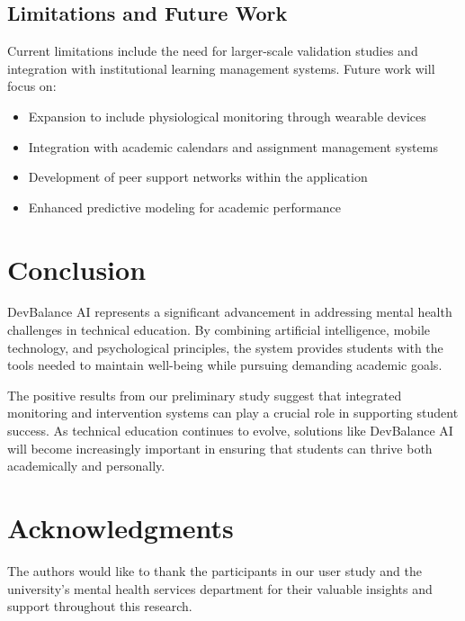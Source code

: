 \documentclass[conference,10pt]{IEEEtran}
\begin{document}
\subsection{Limitations and Future Work}

Current limitations include the need for larger-scale validation studies and integration with institutional learning management systems. Future work will focus on:

\begin{itemize}
\item Expansion to include physiological monitoring through wearable devices
\item Integration with academic calendars and assignment management systems
\item Development of peer support networks within the application
\item Enhanced predictive modeling for academic performance
\end{itemize}

\section{Conclusion}

DevBalance AI represents a significant advancement in addressing mental health challenges in technical education. By combining artificial intelligence, mobile technology, and psychological principles, the system provides students with the tools needed to maintain well-being while pursuing demanding academic goals.

The positive results from our preliminary study suggest that integrated monitoring and intervention systems can play a crucial role in supporting student success. As technical education continues to evolve, solutions like DevBalance AI will become increasingly important in ensuring that students can thrive both academically and personally.

\section*{Acknowledgments}

The authors would like to thank the participants in our user study and the university's mental health services department for their valuable insights and support throughout this research.
\end{document}
